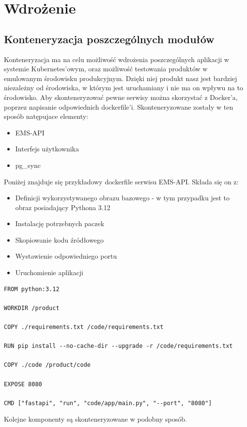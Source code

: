 \newpage
\section{Wdrożenie}
\subsection{Konteneryzacja poszczególnych modułów}
Konteneryzacja ma na celu możliwość wdrożenia poszczególnych aplikacji w systemie Kubernetes'owym, oraz możliwość testowania produktów w emulowanym środowisku produkcyjnym. Dzięki niej produkt nasz jest bardziej niezależny od środowiska, w którym jest uruchamiany i nie ma on wpływu na to środowisko. Aby skonteneryzować pewne serwisy można skorzystać z Docker'a, poprzez napisanie odpowiednich dockerfile'i. Skonteneryzowane zostały w ten sposób natępujace elementy:
\begin{itemize}
    \item EMS-API
    \item Interfejs użytkownika
    \item pg\_sync
\end{itemize}
Poniżej znajduje się przykładowy dockerfile serwisu EMS-API. Składa się on z:
\begin{itemize}
    \item Definicji wykorzystywanego obrazu bazowego - w tym przypadku jest to obraz posiadający Pythona 3.12
    \item Instalację potrzebnych paczek
    \item Skopiowanie kodu źródłowego
    \item Wystawienie odpowiedniego portu
    \item Uruchomienie aplikacji
\end{itemize}
\begin{verbatim}
FROM python:3.12

WORKDIR /product

COPY ./requirements.txt /code/requirements.txt

RUN pip install --no-cache-dir --upgrade -r /code/requirements.txt

COPY ./code /product/code

EXPOSE 8080

CMD ["fastapi", "run", "code/app/main.py", "--port", "8080"]
\end{verbatim}
Kolejne komponenty są skonteneryzowane w podobny sposób.

